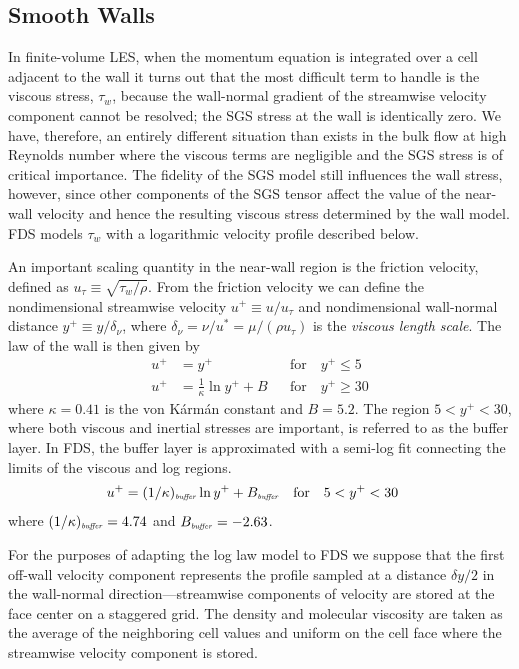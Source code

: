 \subsection{Smooth Walls}
\label{smooth_wall_model}

In finite-volume LES, when the momentum equation is integrated over a cell adjacent to the wall it turns out that the most difficult term to handle is the viscous stress, $\tau_w$, because the wall-normal gradient of the streamwise velocity component cannot be resolved; the SGS stress at the wall is identically zero.  We have, therefore, an entirely different situation than exists in the bulk flow at high Reynolds number where the viscous terms are negligible and the SGS stress is of critical importance.  The fidelity of the SGS model still influences the wall stress, however, since other components of the SGS tensor affect the value of the near-wall velocity and hence the resulting viscous stress determined by the wall model. FDS models $\tau_w$ with a logarithmic velocity profile \cite{Pope:2000} described below.

An important scaling quantity in the near-wall region is the friction velocity, defined as $u_\tau \equiv \sqrt{\tau_w/\rho}$.
From the friction velocity we can define the nondimensional streamwise velocity $u^+ \equiv u/u_\tau$ and nondimensional wall-normal distance $y^+ \equiv y/\delta_\nu$, where $\delta_\nu = \nu/u^* = \mu/(\rho u_\tau)$ is the \emph{viscous length scale}. The law of the wall is then given by
\begin{align}
\label{eqn_visclayer} u^+ &= y^+                           && \mbox{for} \quad y^+ \le 5 \\
\label{eqn_loglaw}    u^+ &= \frac{1}{\kappa} \ln y^+ + B  && \mbox{for} \quad y^+ \ge 30
\end{align}
where $\kappa = 0.41$ is the von K\'arm\'an constant and $B=5.2$.  The region $5 < y^+ < 30$, where both viscous and inertial stresses are important, is referred to as the buffer layer.  In FDS, the buffer layer is approximated with a semi-log fit connecting the limits of the viscous and log regions.
\begin{align}
\label{eqn_buffer_layer}
u^+ &= (1/\kappa)_{\mbox{\tiny\emph{buffer}}} \ln y^+ + B_{\mbox{\tiny\emph{buffer}}}  && \mbox{for} \quad 5 < y^+ < 30
\end{align}
where $(1/\kappa)_{\mbox{\tiny\emph{buffer}}}=4.74$ and $B_{\mbox{\tiny\emph{buffer}}}=-2.63$.

For the purposes of adapting the log law model to FDS we suppose that the first off-wall velocity component represents the profile sampled at a distance $\delta y/2$ in the wall-normal direction---streamwise components of velocity are stored at the face center on a staggered grid.  The density and molecular viscosity are taken as the average of the neighboring cell values and uniform on the cell face where the streamwise velocity component is stored.

